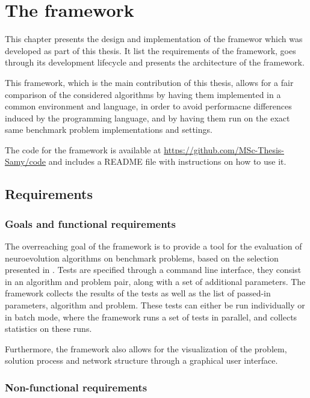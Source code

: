 \chapter{The framework}
\label{chap:framework}

This chapter presents the design and implementation of the framewor which was developed as part of this thesis.
It list the requirements of the framework, goes through its development lifecycle and presents the architecture of the framework.

This framework, which is the main contribution of this thesis, allows for a fair comparison of the considered algorithms by having them implemented in a common environment
and language, in order to avoid performacne differences induced by the programming language, and by having them run on the exact same benchmark problem implementations and
settings.

The code for the framework is available at \url{https://github.com/MSc-Thesis-Samy/code} and includes a README file with instructions on how to use it.

\section{Requirements}

\subsection{Goals and functional requirements}

The overreaching goal of the framework is to provide a tool for the evaluation of neuroevolution algorithms on benchmark problems, based on the selection
presented in .
Tests are specified through a command line interface, they consist in an algorithm and problem pair, along with a set of additional parameters.
The framework collects the results of the tests as well as the list of passed-in parameters, algorithm and problem.
These tests can either be run individually or in batch mode, where the framework runs a set of tests in parallel, and collects statistics on these runs.

Furthermore, the framework also allows for the visualization of the problem, solution process and network structure through a graphical user interface.

\subsection{Non-functional requirements}

